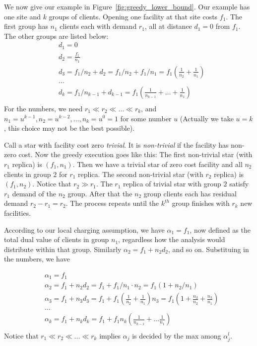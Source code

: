 \documentclass[oneside,final]{ucr}
\begin{document}
We now give our example in
Figure~\ref{fig:greedy_lower_bound}. Our example has one
site and $k$ groups of clients. Opening one facility at that
site costs $f_1$. The first group has $n_1$ clients each
with demand $r_1$, all at distance $d_1 = 0$ from $f_1$. The
other groups are listed below:
\begin{align*}
  &d_1 = 0\\
  &d_2 = \frac{f_1}{n_1}\\
  &d_3 = f_1/n_2 + d_2 = f_1/n_2 + f_1/n_1 = f_1 (\frac{1}{n_2} + \frac{1}{n_1})\\
  &\ldots\\
  &d_k = f_1/n_{k-1} + d_{k-1} = f_1 (\frac{1}{n_{k-1}} + \ldots + \frac{1}{n_1})\\
\end{align*}
For the numbers, we need $r_1 \ll r_2 \ll \ldots \ll r_k$,
and $n_1 = u^{k-1}, n_2 = u^{k-2}, \ldots, n_k = u^0 = 1$
for some number $u$ (Actually we take $u=k$, this choice may
not be the best possible).

Call a star with facility cost zero \emph{trivial}. It is
\emph{non-trivial} if the facility has non-zero cost. Now
the greedy execution goes like this: The first non-trivial
star (with $r_1$ replica) is $(f_1, n_1)$. Then we have a
trivial star of zero cost facility and all $n_2$ clients in
group $2$ for $r_1$ replica. The second non-trivial star
(with $r_2$ replica) is $(f_1, n_2)$. Notice that $r_2 \gg
r_1$. The $r_1$ replica of trivial star with group $2$
satisfy $r_1$ demand of the $n_2$ group. After that the
$n_2$ group clients each has residual demand $r_2 - r_1 =
r_2$. The process repeats until the $k^{th}$ group finishes
with $r_k$ new facilities.

According to our local charging assumption, we have
$\alpha_1 = f_1$, now defined as the total dual value of
clients in group $n_1$, regardless how the analysis would
distribute within that group. Similarly $\alpha_2 = f_1 +
n_2 d_2$, and so on. Substituing in the numbers, we have

\begin{align*}
  &\alpha_1 = f_1\\
  &\alpha_2 = f_1 + n_2 d_2 = f_1 + f_1/n_1\cdot n_2 = f_1 (1 + n_2 /
  n_1)\\
  &\alpha_3 = f_1 + n_3 d_3 = f_1 + f_1 (\frac{1}{n_2} +
  \frac{1}{n_1}) n_3 = f_1 (1 + \frac{n_3}{n_2} + \frac{n_3}{n_1})\\
  &\ldots\\
  &\alpha_k = f_1 + n_k d_k = f_1 + f_1 n_k (\frac{1}{n_{k-1}} + \ldots
  \frac{1}{n_1})\\
\end{align*}
Notice that $r_1 \ll r_2 \ll \ldots \ll r_k$ implies $\alpha_j$ is
decided by the max among $\alpha_j^l$.
\end{document}
